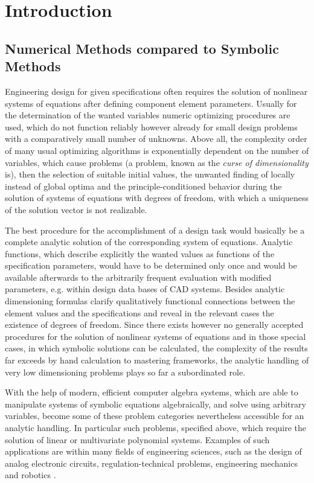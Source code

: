 \section{Introduction}

\subsection{Numerical Methods compared to Symbolic Methods}

Engineering design for given specifications  often requires the solution of nonlinear systems of equations after defining component element parameters.
Usually for the determination of the wanted variables numeric optimizing procedures are used, which do not function reliably however already for small design problems with a comparatively small number of unknowns. 
Above all, the complexity order of many usual optimizing algorithms is exponentially dependent on the number of variables, which  cause problems  (a problem, known as the {\em curse of dimensionality} \cite{Michalewicz} is), then the selection of suitable initial values, the unwanted finding of locally instead of global optima and the principle-conditioned behavior during the solution of systems of equations with degrees of freedom, with which a uniqueness of the solution vector is not realizable. 

The best procedure for the accomplishment of a design task would basically be a complete analytic solution of the corresponding system of equations. Analytic functions, which describe explicitly the wanted values as functions of the specification parameters, would have to be determined only once and would be available afterwards to the arbitrarily frequent evaluation with modified parameters, e.g. within design data bases of CAD systems. Besides analytic dimensioning formulas clarify qualitatively functional connections between the element values and the specifications and reveal in the relevant cases  the existence of degrees of freedom. 
Since there exists however no generally accepted procedures for the solution of nonlinear systems of equations and in those special cases, in which symbolic solutions can be calculated, the complexity of the results far exceeds by hand calculation to mastering frameworks, the analytic handling of very low dimensioning problems plays so far a subordinated role. 

With the help of modern, efficient computer algebra systems, which are able to manipulate   systems of symbolic equations algebraically, and solve using arbitrary variables, become some of these problem categories nevertheless accessible for an analytic handling. In particular such problems, specified above, which require the solution of linear or multivariate polynomial systems.
Examples of such applications are within many fields of engineering sciences, such as the design of analog electronic circuits, regulation-technical problems, engineering mechanics and robotics \cite{Pfalzgraf}.



